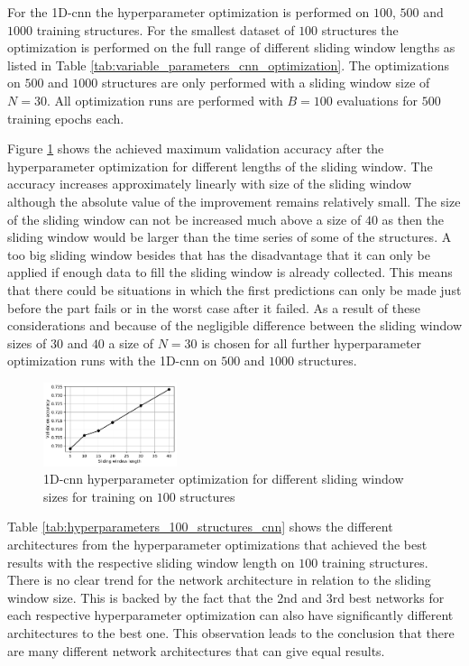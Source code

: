 \documentclass[conference]{IEEEtran}
\begin{document}
For the 1D-\gls{cnn} the hyperparameter optimization is performed on $ 100 $, $ 500 $ and $ 1000 $  training structures. For the smallest dataset of $ 100 $ structures the optimization is performed on the full range of different sliding window lengths as listed in Table \ref{tab:variable_parameters_cnn_optimization}. The optimizations on $ 500 $ and $ 1000 $ structures are only performed with a sliding window size of $ N = 30 $. All optimization runs are performed with $ B = 100 $ evaluations for $ 500 $ training epochs each.

Figure \ref{fig:influence_sequence_length_cnn} shows the achieved maximum validation accuracy after the hyperparameter optimization for different lengths of the sliding window. The accuracy increases approximately linearly with size of the sliding window although the absolute value of the improvement remains relatively small. The size of the sliding window can not be increased much above a size of $ 40 $ as then the sliding window would be larger than the time series of some of the structures. A too big sliding window besides that has the disadvantage that it can only be applied if enough data to fill the sliding window is already collected. This means that there could be situations in which the first predictions can only be made just before the part fails or in the worst case after it failed. As a result of these considerations and because of the negligible difference between the sliding window sizes of $ 30 $ and $ 40 $ a size of $ N = 30 $ is chosen for all further hyperparameter optimization runs with the 1D-\gls{cnn} on $ 500 $ and $ 1000 $ structures.

\begin{figure}[htp]
	\centering
	\includegraphics[width=0.35\textwidth]{python/influence_sequence_length_cnn.pdf}
	\caption{1D-\gls{cnn} hyperparameter optimization for different sliding window sizes for training on $ 100 $ structures}
	\label{fig:influence_sequence_length_cnn}
\end{figure}

Table \ref{tab:hyperparameters_100_structures_cnn} shows the different architectures from the hyperparameter optimizations that achieved the best results with the respective sliding window length on $ 100 $ training structures. There is no clear trend for the network architecture in relation to the sliding window size. This is backed by the fact that the 2nd and 3rd best networks for each respective hyperparameter optimization can also have significantly different architectures to the best one. This observation leads to the conclusion that there are many different network architectures that can give equal results.
\end{document}
